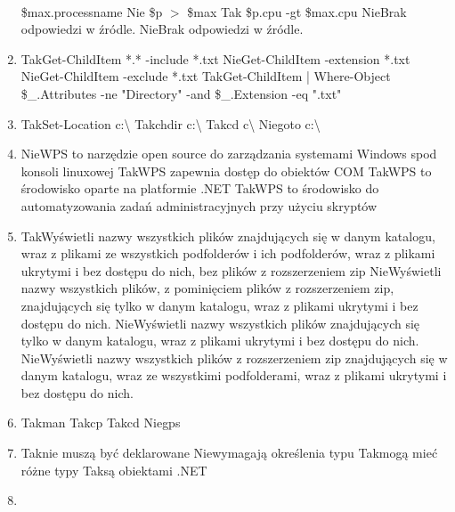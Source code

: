 \begin{enumerate}
{{			}\\
			\$max.processname
			}%
		{Nie}{ \$p $ > $ \$max }%
		{Tak}{ \$p.cpu -gt \$max.cpu }%
		{Nie}{Brak odpowiedzi w źródle.}%
		{Nie}{Brak odpowiedzi w źródle.}
		\item {}%
		{Tak}{Get-ChildItem *.* -include *.txt}%
		{Nie}{Get-ChildItem -extension *.txt}%
		{Nie}{Get-ChildItem -exclude *.txt}%
		{Tak}{Get-ChildItem | Where-Object {\$\_.Attributes -ne "Directory" -and \$\_.Extension -eq ".txt"}}
		\item {}%
		{Tak}{Set-Location c:\textbackslash}%
		{Tak}{chdir c:\textbackslash}%
		{Tak}{cd c\textbackslash}%
		{Nie}{goto c:\textbackslash}
		\item {}%
		{Nie}{WPS to narzędzie open source do zarządzania systemami Windows spod konsoli linuxowej}%
		{Tak}{WPS zapewnia dostęp do obiektów COM}%
		{Tak}{WPS to środowisko oparte na platformie .NET}%
		{Tak}{WPS to środowisko do automatyzowania zadań administracyjnych przy użyciu skryptów}
		\item {}%
		{Tak}{Wyświetli nazwy wszystkich plików znajdujących się w danym katalogu, wraz z plikami ze wszystkich podfolderów i ich podfolderów, wraz z plikami ukrytymi i bez dostępu do nich, bez plików z rozszerzeniem zip}%
		{Nie}{Wyświetli nazwy wszystkich plików, z pominięciem plików z rozszerzeniem zip, znajdujących się tylko w danym katalogu, wraz z plikami ukrytymi i bez dostępu do nich.}%
		{Nie}{Wyświetli nazwy wszystkich plików znajdujących się tylko w danym katalogu, wraz z plikami ukrytymi i bez dostępu do nich.}%
		{Nie}{Wyświetli nazwy wszystkich plików z rozszerzeniem zip znajdujących się w danym katalogu, wraz ze wszystkimi podfolderami, wraz z plikami ukrytymi i bez dostępu do nich.}
		\item {}%
		{Tak}{man}%
		{Tak}{cp}%
		{Tak}{cd}%
		{Nie}{gps}
		\item {}%
		{Tak}{nie muszą być deklarowane}%
		{Nie}{wymagają określenia typu}%
		{Tak}{mogą mieć różne typy}%
		{Tak}{są obiektami .NET}
		\item {}%

\end{enumerate}
